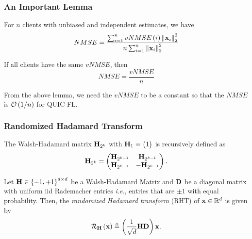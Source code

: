 \documentclass{beamer}
\begin{document}
    \begin{frame}
        \frametitle{An Important Lemma}
        \begin{lemma}
            \label{lem:vnmse-nmse-rel}
            For \(n\) clients with unbiased and independent estimates, we have
            \cite{EDEN}
            \begin{equation}
                NMSE = \frac{\sum_{i=1}^nvNMSE\left(i\right)\left\lVert\boldsymbol{\mathbf{x}}_i\right\rVert_2^2}{n\sum_{i=1}^n\left\lVert\boldsymbol{\mathbf{x}}_i\right\rVert_2^2}
                \label{eq:vnmse-nmse-rel}
            \end{equation}
        \end{lemma}
        \begin{corollary}
            \label{cor:vnmse-nmse-ball}
            If all clients have the same \(vNMSE\), then
            \begin{equation}
                NMSE = \frac{vNMSE}{n}
                \label{eq:vnmse-nmse-ball}
            \end{equation}
        \end{corollary}
        From the above lemma, we need the \(vNMSE\) to be a constant so that the
        \(NMSE\) is \(\mathcal O\left(1/n\right)\) for QUIC-FL.
    \end{frame}

    \begin{frame}
        \frametitle{Randomized Hadamard Transform}
        \begin{definition}
            The Walsh-Hadamard matrix \(\boldsymbol{\mathbf{H}}_{2^k}\) with \(\boldsymbol{\mathbf{H}}_1 = 
            \begin{pmatrix}1\end{pmatrix}\) is recursively defined as
            \begin{equation}
                \boldsymbol{\mathbf{H}}_{2^k} = \begin{pmatrix}\boldsymbol{\mathbf{H}}_{2^{k-1}} & \boldsymbol{\mathbf{H}}_{2^{k-1}} \\ \boldsymbol{\mathbf{H}}_{2^{k-1}} & -\boldsymbol{\mathbf{H}}_{2^{k-1}}\end{pmatrix}.
                \label{eq:Hl-def}
            \end{equation}
        \end{definition}
        \begin{definition}
            Let \(\boldsymbol{\mathbf{H}}\in\left\{-1,+1\right\}^{d\times d}\) be a Walsh-Hadamard 
            Matrix and \(\boldsymbol{\mathbf{D}}\) be a diagonal matrix with uniform iid 
            Rademacher entries \emph{i.e.}, entries that are \(\pm 1\) with 
            equal probability. Then, the \emph{randomized Hadamard transform} 
            (RHT) of \(\boldsymbol{\mathbf{x}}\in\mathbb R^d\) is given by
            \begin{equation}
                \mathcal R_{\boldsymbol{\mathbf{H}}}\left(\boldsymbol{\mathbf{x}}\right) \triangleq \left(\frac{1}{\sqrt{d}}\boldsymbol{\mathbf{HD}}\right)\boldsymbol{\mathbf{x}}.
                \label{eq:rht-def}
            \end{equation}
        \end{definition}
    \end{frame}
\end{document}
